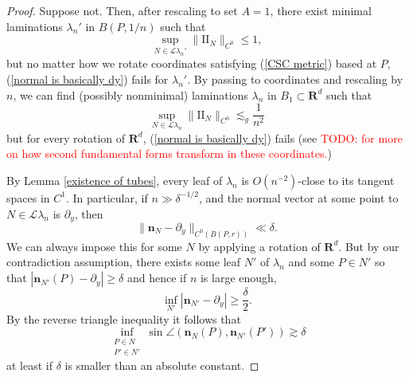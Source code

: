 \documentclass[reqno,11pt]{amsart}
\newcommand{\RR}{\mathbf{R}}
\newcommand{\Leaves}{\mathscr L}
\newcommand{\Two}{\mathrm{I\!I}}
\newcommand{\normal}{\mathbf n}
\newcommand{\inj}{\mathrm{inj}}
\newtheorem{sublemma}[theorem]{Sublemma}
\theoremstyle{definition}
\numberwithin{equation}{section}
\newcommand\todo[1]{\textcolor{red}{TODO: #1}}
\begin{document}
\begin{proof}
	Suppose not.
	Then, after rescaling to set $A = 1$, there exist minimal laminations $\lambda_n'$ in $B(P, 1/n)$ such that
	$$\sup_{N \in \Leaves \lambda_n'} \|\Two_N\|_{C^0} \leq 1,$$
	but no matter how we rotate coordinates satisfying (\ref{CSC metric}) based at $P$, (\ref{normal is basically dy}) fails for $\lambda_n'$.
	By passing to coordinates and rescaling by $n$, we can find (possibly nonminimal) laminations $\lambda_n$ in $B_1 \subset \RR^d$ such that
\begin{equation}\label{bounds on Two in representation}
	\sup_{N \in \Leaves \lambda_n} \|\Two_N\|_{C^0} \lesssim_g \frac{1}{n^2}
\end{equation}
	but for every rotation of $\RR^d$, (\ref{normal is basically dy}) fails (see \todo{\cite{BackusFLG} for more on how second fundamental forms transform in these coordinates.})



	By Lemma \ref{existence of tubes}, every leaf of $\lambda_n$ is $O(n^{-2})$-close to its tangent spaces in $C^1$.
	In particular, if $n \gg \delta^{-1/2}$, and the normal vector at some point to $N \in \Leaves \lambda_n$ is $\partial_y$, then
	$$\|\normal_N - \partial_y\|_{C^0(B(P, r))} \ll \delta.$$
	We can always impose this for some $N$ by applying a rotation of $\RR^d$.
	But by our contradiction assumption, there exists some leaf $N'$ of $\lambda_n$ and some $P \in N'$ so that $|\normal_{N'}(P) - \partial_y| \geq \delta$ and hence if $n$ is large enough,
	$$\inf_{N'} |\normal_{N'} - \partial_y| \geq \frac{\delta}{2}.$$
	By the reverse triangle inequality it follows that
\begin{equation}\label{discrepancy in normals}
	\inf_{\substack{P \in N\\ P' \in N'}} \sin \angle(\normal_N(P), \normal_{N'}(P')) \gtrsim \delta
\end{equation}
	at least if $\delta$ is smaller than an absolute constant.
	

\end{proof}
\end{document}
